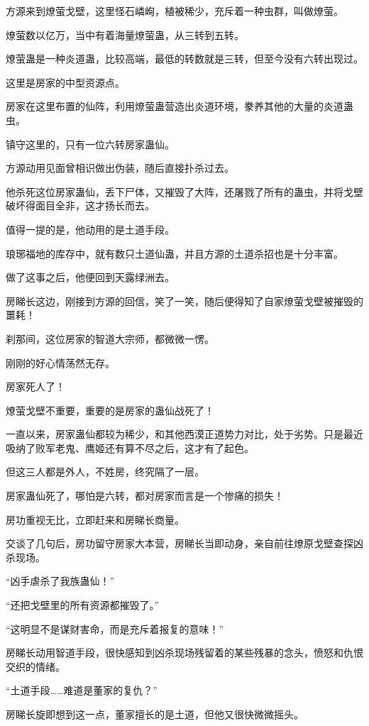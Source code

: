 \begin{this_body}
方源来到燎萤戈壁，这里怪石嶙峋，植被稀少，充斥着一种虫群，叫做燎萤。

燎萤数以亿万，当中有着海量燎萤蛊，从三转到五转。

燎萤蛊是一种炎道蛊，比较高端，最低的转数就是三转，但至今没有六转出现过。

这里是房家的中型资源点。

房家在这里布置的仙阵，利用燎萤蛊营造出炎道环境，豢养其他的大量的炎道蛊虫。

镇守这里的，只有一位六转房家蛊仙。

方源动用见面曾相识做出伪装，随后直接扑杀过去。

他杀死这位房家蛊仙，丢下尸体，又摧毁了大阵，还屠戮了所有的蛊虫，并将戈壁破坏得面目全非，这才扬长而去。

值得一提的是，他动用的是土道手段。

琅琊福地的库存中，就有数只土道仙蛊，并且方源的土道杀招也是十分丰富。

做了这事之后，他便回到天露绿洲去。

房睇长这边，刚接到方源的回信，笑了一笑，随后便得知了自家燎萤戈壁被摧毁的噩耗！

刹那间，这位房家的智道大宗师，都微微一愣。

刚刚的好心情荡然无存。

房家死人了！

燎萤戈壁不重要，重要的是房家的蛊仙战死了！

一直以来，房家蛊仙都较为稀少，和其他西漠正道势力对比，处于劣势。只是最近吸纳了败军老鬼、鹰姬还有算不尽之后，这才有了起色。

但这三人都是外人，不姓房，终究隔了一层。

房家蛊仙死了，哪怕是六转，都对房家而言是一个惨痛的损失！

房功重视无比，立即赶来和房睇长商量。

交谈了几句后，房功留守房家大本营，房睇长当即动身，亲自前往燎原戈壁查探凶杀现场。

“凶手虐杀了我族蛊仙！”

“还把戈壁里的所有资源都摧毁了。”

“这明显不是谋财害命，而是充斥着报复的意味！”

房睇长动用智道手段，很快感知到凶杀现场残留着的某些残暴的念头，愤怒和仇恨交织的情绪。

“土道手段……难道是董家的复仇？”

房睇长旋即想到这一点，董家擅长的是土道，但他又很快微微摇头。


\end{this_body}
